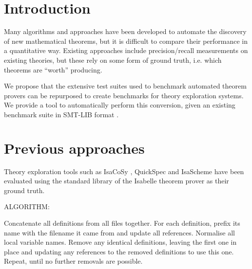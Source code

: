 \documentclass[12pt]{article}
\begin{document}
\maketitle

\begin{abstract}

\end{abstract}

\section{Introduction}

Many algorithms and approaches have been developed to automate the discovery of new mathematical theorems, but it is difficult to compare their performance in a quantitative way. Existing approaches include precision/recall measurements on existing theories, but these rely on some form of ground truth, i.e. which theorems are ``worth'' producing.

We propose that the extensive test suites used to benchmark automated theorem provers can be repurposed to create benchmarks for theory exploration systems. We provide a tool to automatically perform this conversion, given an existing benchmark suite in SMT-LIB format \cite{BarFT-SMTLIB}.

\section{Previous approaches}\label{previous approaches}

Theory exploration tools such as IsaCoSy \cite{Johansson.Dixon.Bundy:conjecture-generation}, QuickSpec and IsaScheme have been evaluated using the standard library of the Isabelle theorem prover as their ground truth.

ALGORITHM:

Concatenate all definitions from all files together.
For each definition, prefix its name with the filename it came from and update all references.
Normalise all local variable names.
Remove any identical definitions, leaving the first one in place and updating any references to the removed definitions to use this one.
Repeat, until no further removals are possible.



\end{document}
